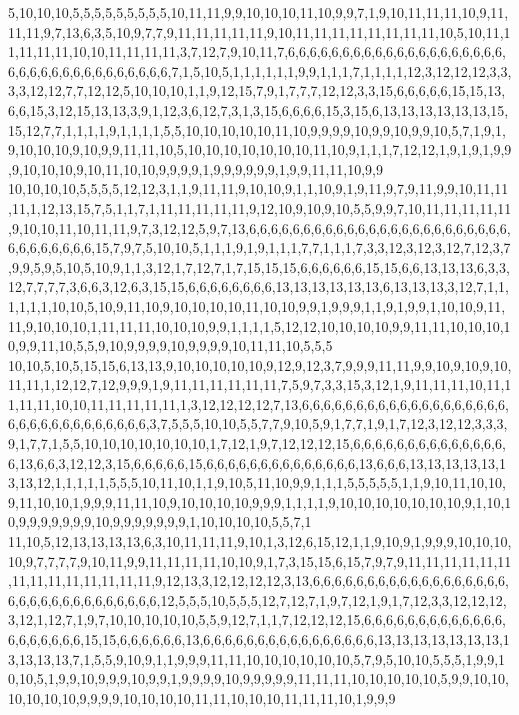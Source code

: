 5,10,10,10,5,5,5,5,5,5,5,5,5,10,11,11,9,9,10,10,10,11,10,9,9,7,1,9,10,11,11,11,10,9,11,11,11,9,7,13,6,3,5,10,9,7,7,9,11,11,11,11,11,9,10,11,11,11,11,11,11,11,11,10,5,10,11,11,11,11,11,10,10,11,11,11,11,3,7,12,7,9,10,11,7,6,6,6,6,6,6,6,6,6,6,6,6,6,6,6,6,6,6,6,6,6,6,6,6,6,6,6,6,6,6,6,6,6,6,6,7,1,5,10,5,1,1,1,1,1,1,9,9,1,1,1,7,1,1,1,1,12,3,12,12,12,3,3,3,3,12,12,7,7,12,12,5,10,10,10,1,1,9,12,15,7,9,1,7,7,7,12,12,3,3,15,6,6,6,6,6,15,15,13,6,6,15,3,12,15,13,13,3,9,1,12,3,6,12,7,3,1,3,15,6,6,6,6,15,3,15,6,13,13,13,13,13,13,15,15,12,7,7,1,1,1,1,9,1,1,1,1,5,5,10,10,10,10,10,11,10,9,9,9,9,10,9,9,10,9,9,10,5,7,1,9,1,9,10,10,10,9,10,9,9,11,11,10,5,10,10,10,10,10,10,10,11,10,9,1,1,1,7,12,12,1,9,1,9,1,9,9,9,10,10,10,9,10,11,10,10,9,9,9,9,1,9,9,9,9,9,9,1,9,9,11,11,10,9,9
10,10,10,10,5,5,5,5,12,12,3,1,1,9,11,11,9,10,10,9,1,1,10,9,1,9,11,9,7,9,11,9,9,10,11,11,11,1,12,13,15,7,5,1,1,7,1,11,11,11,11,11,9,12,10,9,10,9,10,5,5,9,9,7,10,11,11,11,11,11,9,10,10,11,10,11,11,9,7,3,12,12,5,9,7,13,6,6,6,6,6,6,6,6,6,6,6,6,6,6,6,6,6,6,6,6,6,6,6,6,6,6,6,6,6,6,6,6,15,7,9,7,5,10,10,5,1,1,1,9,1,9,1,1,1,7,7,1,1,1,7,3,3,12,3,12,3,12,7,12,3,7,9,9,5,9,5,10,5,10,9,1,1,3,12,1,7,12,7,1,7,15,15,15,6,6,6,6,6,6,15,15,6,6,13,13,13,6,3,3,12,7,7,7,7,3,6,6,3,12,6,3,15,15,6,6,6,6,6,6,6,6,13,13,13,13,13,13,6,13,13,13,3,12,7,1,1,1,1,1,1,10,10,5,10,9,11,10,9,10,10,10,10,11,10,10,9,9,1,9,9,9,1,1,9,1,9,9,1,10,10,9,11,11,9,10,10,10,1,11,11,11,10,10,10,9,9,1,1,1,1,5,12,12,10,10,10,10,9,9,11,11,10,10,10,10,9,9,11,10,5,5,9,10,9,9,9,9,10,9,9,9,9,10,11,11,10,5,5,5
10,10,5,10,5,15,15,6,13,13,9,10,10,10,10,10,9,12,9,12,3,7,9,9,9,11,11,9,9,10,9,10,9,10,11,11,1,12,12,7,12,9,9,9,1,9,11,11,11,11,11,11,7,5,9,7,3,3,15,3,12,1,9,11,11,11,10,11,11,11,11,10,10,11,11,11,11,11,1,3,12,12,12,12,7,13,6,6,6,6,6,6,6,6,6,6,6,6,6,6,6,6,6,6,6,6,6,6,6,6,6,6,6,6,6,6,6,6,3,7,5,5,5,10,10,5,5,7,7,9,10,5,9,1,7,7,1,9,1,7,12,3,12,12,3,3,3,9,1,7,7,1,5,5,10,10,10,10,10,10,10,1,7,12,1,9,7,12,12,12,15,6,6,6,6,6,6,6,6,6,6,6,6,6,6,6,13,6,6,3,12,12,3,15,6,6,6,6,6,15,6,6,6,6,6,6,6,6,6,6,6,6,6,6,13,6,6,6,13,13,13,13,13,13,13,12,1,1,1,1,1,5,5,5,10,11,10,1,1,9,10,5,11,10,9,9,1,1,1,5,5,5,5,5,1,1,9,10,11,10,10,9,11,10,10,1,9,9,9,11,11,10,9,10,10,10,10,9,9,9,1,1,1,1,9,10,10,10,10,10,10,10,9,1,10,10,9,9,9,9,9,9,9,10,9,9,9,9,9,9,9,1,10,10,10,10,5,5,7,1
11,10,5,12,13,13,13,13,6,3,10,11,11,11,9,10,1,3,12,6,15,12,1,1,9,10,9,1,9,9,9,10,10,10,10,9,7,7,7,7,9,10,11,9,9,11,11,11,11,10,10,9,1,7,3,15,15,6,15,7,9,7,9,11,11,11,11,11,11,11,11,11,11,11,11,11,11,9,12,13,3,12,12,12,12,3,13,6,6,6,6,6,6,6,6,6,6,6,6,6,6,6,6,6,6,6,6,6,6,6,6,6,6,6,6,6,6,6,6,12,5,5,5,10,5,5,5,12,7,12,7,1,9,7,12,1,9,1,7,12,3,3,12,12,12,3,12,1,12,7,1,9,7,10,10,10,10,10,5,5,9,12,7,1,1,7,12,12,12,15,6,6,6,6,6,6,6,6,6,6,6,6,6,6,6,6,6,6,6,6,15,15,6,6,6,6,6,6,13,6,6,6,6,6,6,6,6,6,6,6,6,6,6,6,6,13,13,13,13,13,13,13,13,13,13,13,7,1,5,5,9,10,9,1,1,9,9,9,11,11,10,10,10,10,10,10,5,7,9,5,10,10,5,5,5,1,9,9,10,10,5,1,9,9,10,9,9,9,10,9,9,1,9,9,9,9,10,9,9,9,9,9,11,11,11,10,10,10,10,10,5,9,9,10,10,10,10,10,10,9,9,9,9,10,10,10,10,11,11,10,10,10,11,11,11,10,1,9,9,9
